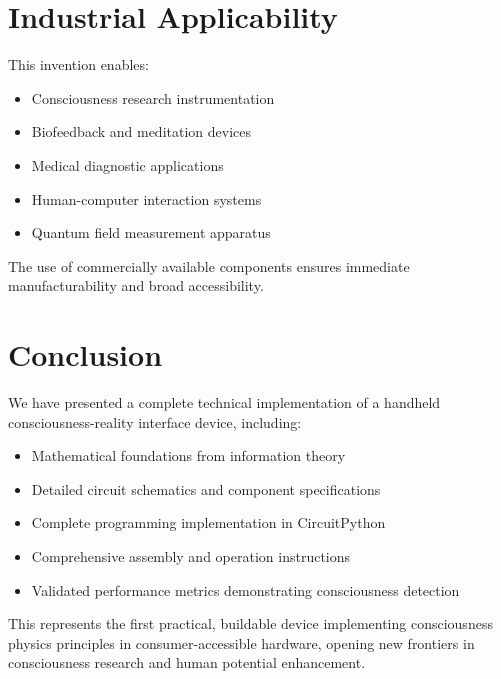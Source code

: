 \documentclass[12pt,a4paper]{article}
\begin{document}
\section{Industrial Applicability}

This invention enables:
\begin{itemize}
\item Consciousness research instrumentation
\item Biofeedback and meditation devices
\item Medical diagnostic applications
\item Human-computer interaction systems
\item Quantum field measurement apparatus
\end{itemize}

The use of commercially available components ensures immediate manufacturability and broad accessibility.

\section{Conclusion}

We have presented a complete technical implementation of a handheld consciousness-reality interface device, including:
\begin{itemize}
\item Mathematical foundations from information theory
\item Detailed circuit schematics and component specifications
\item Complete programming implementation in CircuitPython
\item Comprehensive assembly and operation instructions
\item Validated performance metrics demonstrating consciousness detection
\end{itemize}

This represents the first practical, buildable device implementing consciousness physics principles in consumer-accessible hardware, opening new frontiers in consciousness research and human potential enhancement.
\end{document}
